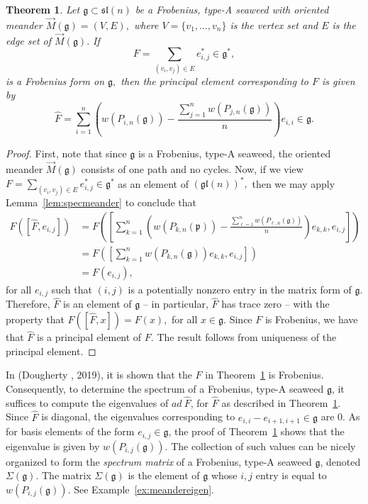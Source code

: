 \documentclass[letterpaper,10pt]{article}
\newtheorem{theorem}{Theorem}
\begin{document}
\begin{theorem}\label{thm:specmeander}
Let $\mathfrak{g}\subset\mathfrak{sl}(n)$ be a Frobenius, type-A seaweed with oriented meander $\overrightarrow{M}(\mathfrak{g})=(V,E),$ where $V=\{v_1,\dots,v_n\}$ is the vertex set and $E$ is the edge set of $\overrightarrow{M}(\mathfrak{g}).$ If $$F=\sum_{(v_i,v_j)\in E}e_{i,j}^*\in\mathfrak{g}^*,$$ is a Frobenius form on $\mathfrak{g},$ then the principal element corresponding to $F$ is given by $$\widehat{F}=\sum_{i=1}^n\left(w(P_{i,n}(\mathfrak{g}))-\frac{\sum_{j=1}^n w(P_{j,n}(\mathfrak{g}))}{n}\right)e_{i,i}\in\mathfrak{g}.$$
\end{theorem}
\begin{proof}
First, note that since $\mathfrak{g}$ is a Frobenius, type-A seaweed, the oriented meander $\overrightarrow{M}(\mathfrak{g})$ consists of one path and no cycles.
 Now, if we view $F=\displaystyle\sum_{(v_i,v_j)\in E}e_{i,j}^*\in\mathfrak{g}^*$ as an element of $(\mathfrak{gl}(n))^*,$ then we may apply Lemma~\ref{lem:specmeander} to conclude that 
 \begin{align*}
        F\left(\left[\widehat{F},e_{i,j}\right]\right)&=F\left(\left[\sum_{k=1}^n\left(w(P_{k,n}(\mathfrak{p}))-\frac{\sum_{\ell=1}^n w(P_{\ell,n}(\mathfrak{g}))}{n}\right)e_{k,k},e_{i,j}\right]\right)\\
        &=F\left(\left[\sum_{k=1}^n w(P_{k,n}(\mathfrak{g}))e_{k,k},e_{i,j}\right]\right)\\
        &=F(e_{i,j}),
 \end{align*}
for all $e_{i,j}$ such that $(i,j)$ is a potentially nonzero entry in the matrix form of $\mathfrak{g}.$
Therefore, $\widehat{F}$ is an element of $\mathfrak{g}$ -- in particular, $\widehat{F}$ has trace zero -- with the property that $F\left(\left[\widehat{F},x\right]\right)=F(x),$ for all $x\in\mathfrak{g}.$ Since $F$ is Frobenius, we have that $\widehat{F}$ is a principal element of $F.$ The result follows from uniqueness of the principal element.
\end{proof}

In (Dougherty \textbf{\cite{aria}}, 2019), it is shown that the $F$ in Theorem~\ref{thm:specmeander} is Frobenius. Consequently, to determine the spectrum of a Frobenius, type-A seaweed $\mathfrak{g}$, it suffices to compute the eigenvalues of $ad~\widehat{F}$, for $\widehat{F}$ as described in Theorem~\ref{thm:specmeander}. Since $\widehat{F}$ is diagonal, the eigenvalues corresponding to $e_{i,i}-e_{i+1,i+1}\in\mathfrak{g}$ are 0. As for basis elements of the form $e_{i,j}\in\mathfrak{g}$, the proof of Theorem~\ref{thm:specmeander} shows that the eigenvalue is given by $w(P_{i,j}(\mathfrak{g}))$. The collection of such values can be nicely organized to form the \textit{spectrum matrix} of a Frobenius, type-A seaweed $\mathfrak{g}$, denoted $\Sigma(\mathfrak{g})$. The matrix $\Sigma(\mathfrak{g})$ is the element of $\mathfrak{g}$ whose $i,j$ entry is equal to $w(P_{i,j}(\mathfrak{g})).$ See Example~\ref{ex:meandereigen}.
\end{document}
